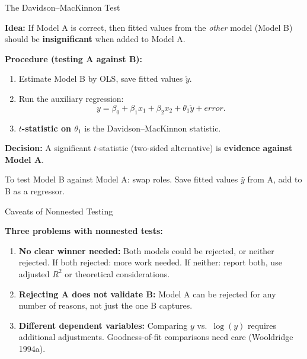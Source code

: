 \documentclass[aspectratio=169, 12pt]{beamer}
\begin{document}
\begin{frame}{The Davidson--MacKinnon Test}

  \textbf{Idea:} If Model A is correct, then fitted values from the \emph{other} model
  (Model B) should be \textbf{insignificant} when added to Model A.

  \medskip
  \textbf{Procedure (testing A against B):}
  \begin{enumerate}\setlength{\itemsep}{1pt}
    \item Estimate Model B by OLS, save fitted values $\check{y}$.
    \item Run the auxiliary regression:
    \[
      y = \beta_0 + \beta_1 x_1 + \beta_2 x_2 + \theta_1 \check{y} + error.
    \]
    \item \textbf{$t$-statistic on $\theta_1$} is the Davidson--MacKinnon statistic.
  \end{enumerate}

  \begin{highlightbox}
    \textbf{Decision:} A significant $t$-statistic (two-sided alternative)
    is \textbf{evidence against Model A}.

    \medskip
    To test Model B against Model A: swap roles. Save fitted values $\hat{y}$ from A,
    add to B as a regressor.
  \end{highlightbox}

\end{frame}

\begin{frame}{Caveats of Nonnested Testing}

  \begin{keybox}
    \textbf{Three problems with nonnested tests:}
    \begin{enumerate}\setlength{\itemsep}{2pt}
      \item \textbf{No clear winner needed:} Both models could be rejected, or neither
      rejected. If both rejected: more work needed. If neither: report both, use adjusted $R^2$
      or theoretical considerations.

      \item \textbf{Rejecting A does not validate B:} Model A can be rejected for any
      number of reasons, not just the one B captures.

      \item \textbf{Different dependent variables:} Comparing $y$ vs.\ $\log(y)$ requires
      additional adjustments. Goodness-of-fit comparisons need care (Wooldridge 1994a).
    \end{enumerate}
  \end{keybox}

\end{frame}
\end{document}
